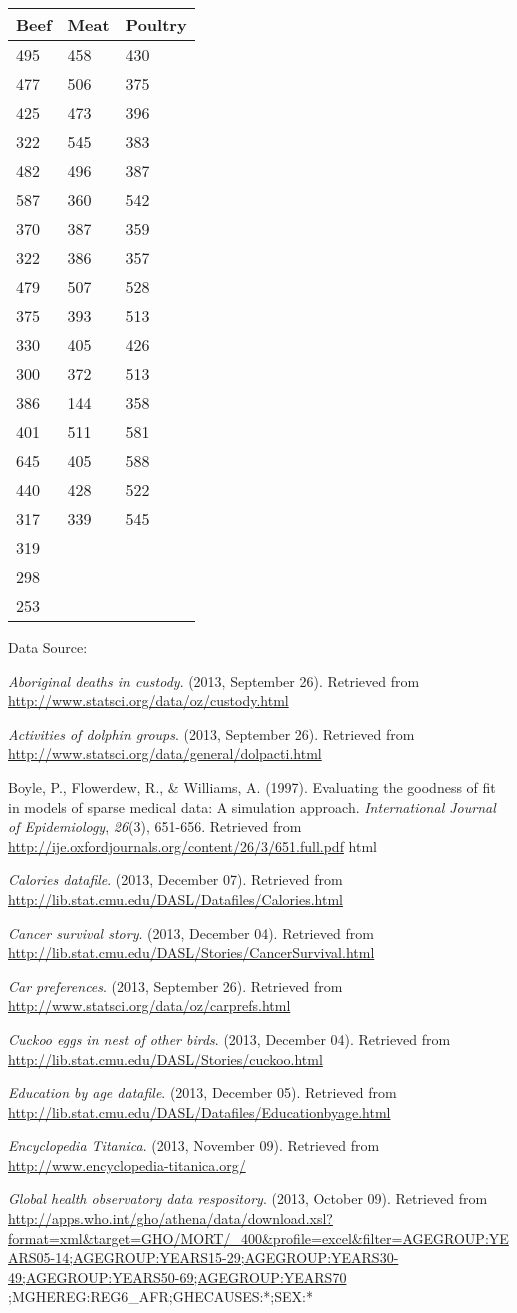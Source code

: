 \documentclass[]{book}
\begin{document}
\begin{longtable}[]{@{}lll@{}}
\toprule
Beef & Meat & Poultry\tabularnewline
\midrule
\endhead
495 & 458 & 430\tabularnewline
477 & 506 & 375\tabularnewline
425 & 473 & 396\tabularnewline
322 & 545 & 383\tabularnewline
482 & 496 & 387\tabularnewline
587 & 360 & 542\tabularnewline
370 & 387 & 359\tabularnewline
322 & 386 & 357\tabularnewline
479 & 507 & 528\tabularnewline
375 & 393 & 513\tabularnewline
330 & 405 & 426\tabularnewline
300 & 372 & 513\tabularnewline
386 & 144 & 358\tabularnewline
401 & 511 & 581\tabularnewline
645 & 405 & 588\tabularnewline
440 & 428 & 522\tabularnewline
317 & 339 & 545\tabularnewline
319 & &\tabularnewline
298 & &\tabularnewline
253 & &\tabularnewline
\bottomrule
\end{longtable}

Data Source:

\emph{Aboriginal deaths in custody}. (2013, September 26). Retrieved from
\url{http://www.statsci.org/data/oz/custody.html}

\emph{Activities of dolphin groups}. (2013, September 26). Retrieved from
\url{http://www.statsci.org/data/general/dolpacti.html}

Boyle, P., Flowerdew, R., \& Williams, A. (1997). Evaluating the goodness
of fit in models of sparse medical data: A simulation approach.
\emph{International Journal of Epidemiology}, \emph{26}(3), 651-656. Retrieved
from \url{http://ije.oxfordjournals.org/content/26/3/651.full.pdf} html

\emph{Calories datafile}. (2013, December 07). Retrieved from
\url{http://lib.stat.cmu.edu/DASL/Datafiles/Calories.html}

\emph{Cancer survival story}. (2013, December 04). Retrieved from
\url{http://lib.stat.cmu.edu/DASL/Stories/CancerSurvival.html}

\emph{Car preferences}. (2013, September 26). Retrieved from
\url{http://www.statsci.org/data/oz/carprefs.html}

\emph{Cuckoo eggs in nest of other birds}. (2013, December 04). Retrieved
from \url{http://lib.stat.cmu.edu/DASL/Stories/cuckoo.html}

\emph{Education by age datafile}. (2013, December 05). Retrieved from
\url{http://lib.stat.cmu.edu/DASL/Datafiles/Educationbyage.html}

\emph{Encyclopedia Titanica}. (2013, November 09). Retrieved from
\url{http://www.encyclopedia-titanica.org/}

\emph{Global health observatory data respository}. (2013, October 09).
Retrieved from
\url{http://apps.who.int/gho/athena/data/download.xsl?format=xml\&target=GHO/MORT/_400\&profile=excel\&filter=AGEGROUP:YEARS05-14;AGEGROUP:YEARS15-29;AGEGROUP:YEARS30-49;AGEGROUP:YEARS50-69;AGEGROUP:YEARS70}
;MGHEREG:REG6\_AFR;GHECAUSES:*;SEX:*
\end{document}
